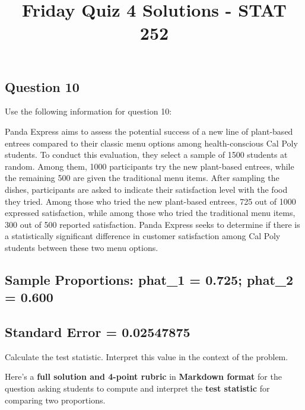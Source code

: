 \documentclass[
  letterpaper,
  DIV=11,
  numbers=noendperiod]{scrartcl}
\title{Friday Quiz 4 Solutions - STAT 252}
\author{}
\date{}
\begin{document}
\maketitle
\ifdefined\Shaded\renewenvironment{Shaded}{\begin{tcolorbox}[enhanced, interior hidden, frame hidden, breakable, sharp corners, boxrule=0pt, borderline west={3pt}{0pt}{shadecolor}]}{\end{tcolorbox}}\fi

\hypertarget{question-10}{%
\subsection{Question 10}\label{question-10}}

Use the following information for question 10:

Panda Express aims to assess the potential success of a new line of
plant-based entrees compared to their classic menu options among
health-conscious Cal Poly students. To conduct this evaluation, they
select a sample of 1500 students at random. Among them, 1000
participants try the new plant-based entrees, while the remaining 500
are given the traditional menu items. After sampling the dishes,
participants are asked to indicate their satisfaction level with the
food they tried. Among those who tried the new plant-based entrees, 725
out of 1000 expressed satisfaction, while among those who tried the
traditional menu items, 300 out of 500 reported satisfaction. Panda
Express seeks to determine if there is a statistically significant
difference in customer satisfaction among Cal Poly students between
these two menu options.

\hypertarget{sample-proportions-phat_1-0.725-phat_2-0.600}{%
\subsection{Sample Proportions: phat\_1 = 0.725; phat\_2 =
0.600}\label{sample-proportions-phat_1-0.725-phat_2-0.600}}

\hypertarget{standard-error-0.02547875}{%
\subsection{Standard Error =
0.02547875}\label{standard-error-0.02547875}}

Calculate the test statistic. Interpret this value in the context of the
problem.

Here's a \textbf{full solution and 4-point rubric} in \textbf{Markdown
format} for the question asking students to compute and interpret the
\textbf{test statistic} for comparing two proportions.
\end{document}
